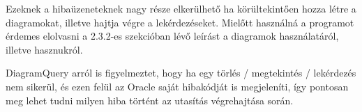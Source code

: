 Ezeknek a hibaüzeneteknek nagy része elkerülhető ha körültekintően hozza létre a diagramokat, illetve hajtja végre a lekérdezéseket. Mielőtt használná a programot
érdemes elolvasni a 2.3.2-es szekcióban lévő leírást a diagramok használatáról, illetve hasznukról.

DiagramQuery arról is figyelmeztet, hogy ha egy törlés / megtekintés / lekérdezés nem sikerül, és ezen felül az Oracle saját hibakódját is megjeleníti, így pontosan
meg lehet tudni milyen hiba történt az utasítás végrehajtása során.